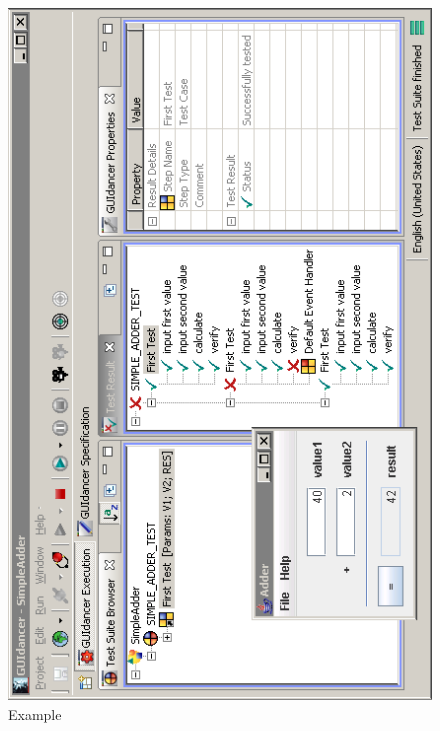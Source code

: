 \begin{enumerate}
\begin{figure}[h]
\includegraphics{Introduction/PS/Execution}
\caption{Example \gdsuite{}}
\label{Testshot}
\end{figure}



 \end{enumerate}
